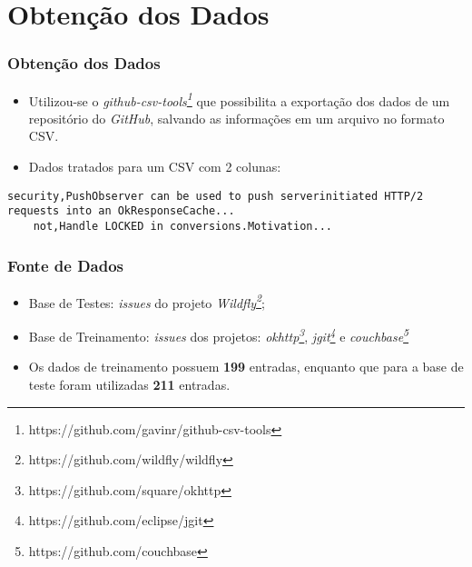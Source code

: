 \section[Obtenção dos Dados]{Obtenção dos Dados}

\begin{frame}[fragile]
  \frametitle{Obtenção dos Dados}
  \begin{itemize}
    \item Utilizou-se o \textit{github-csv-tools\footnote{https://github.com/gavinr/github-csv-tools}} que possibilita a exportação dos dados de um repositório do \textit{GitHub}, salvando as informações em um arquivo no formato CSV.
    \item Dados tratados para um CSV com 2 colunas:
  \end{itemize}
  \begin{lstlisting}[caption={CSV Exemplo com Base de Dados},captionpos=b,frame=single,label={code:csv_example}]
    security,PushObserver can be used to push serverinitiated HTTP/2 requests into an OkResponseCache...
    not,Handle LOCKED in conversions.Motivation...
    \end{lstlisting}
\end{frame}

\begin{frame}
  \frametitle{Fonte de Dados}
  \begin{itemize}
    \item Base de Testes: \textit{issues} do projeto \textit{Wildfly\footnote{https://github.com/wildfly/wildfly}};
    \item Base de Treinamento: \textit{issues} dos projetos: \textit{okhttp\footnote{https://github.com/square/okhttp}}, \textit{jgit\footnote{https://github.com/eclipse/jgit}} e \textit{couchbase\footnote{https://github.com/couchbase}}
    \item Os dados de treinamento possuem \textbf{199} entradas, enquanto que para a base de teste foram utilizadas \textbf{211} entradas.
  \end{itemize}
\end{frame}